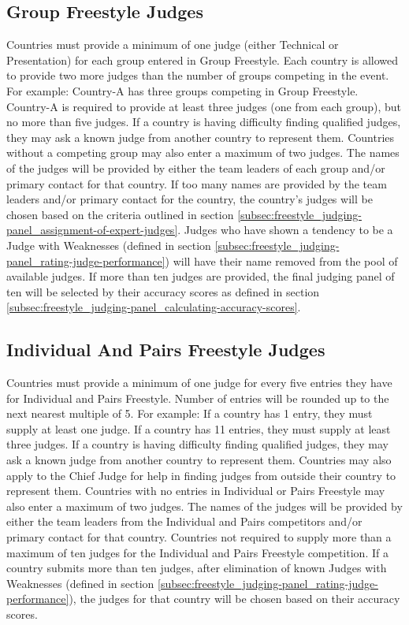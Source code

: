 \subsection{Group Freestyle Judges \label{subsec:freestyle_judging-panel_group-freestyle-judges}}
Countries must provide a minimum of one judge (either Technical or Presentation) for each group entered in Group Freestyle.
Each country is allowed to provide two more judges than the number of groups competing in the event.
For example: Country-A has three groups competing in Group Freestyle.
Country-A is required to provide at least three judges (one from each group), but no more than five judges.
If a country is having difficulty finding qualified judges, they may ask a known judge from another country to represent them.
Countries without a competing group may also enter a maximum of two judges.
The names of the judges will be provided by either the team leaders of each group and/or primary contact for that country.
If too many names are provided by the team leaders and/or primary contact for the country, the country's judges will be chosen based on the criteria outlined in section \ref{subsec:freestyle_judging-panel_assignment-of-expert-judges}.
Judges who have shown a tendency to be a Judge with Weaknesses (defined in section \ref{subsec:freestyle_judging-panel_rating-judge-performance}) will have their name removed from the pool of available judges.
If more than ten judges are provided, the final judging panel of ten will be selected by their accuracy scores as defined in section \ref{subsec:freestyle_judging-panel_calculating-accuracy-scores}.

\subsection{Individual And Pairs Freestyle Judges\label{subsec:freestyle_judging-panel_individual-pairs-freestyle-judges}}
Countries must provide a minimum of one judge for every five entries they have for Individual and Pairs Freestyle.
Number of entries will be rounded up to the next nearest multiple of 5.
For example: If a country has 1 entry, they must supply at least one judge.
If a country has 11 entries, they must supply at least three judges.
If a country is having difficulty finding qualified judges, they may ask a known judge from another country to represent them.
Countries may also apply to the Chief Judge for help in finding judges from outside their country to represent them.
Countries with no entries in Individual or Pairs Freestyle may also enter a maximum of two judges.
The names of the judges will be provided by either the team leaders from the Individual and Pairs competitors and/or primary contact for that country.
Countries not required to supply more than a maximum of ten judges for the Individual and Pairs Freestyle competition.
If a country submits more than ten judges, after elimination of known Judges with Weaknesses (defined in section \ref{subsec:freestyle_judging-panel_rating-judge-performance}), the judges for that country will be chosen based on their accuracy scores.

